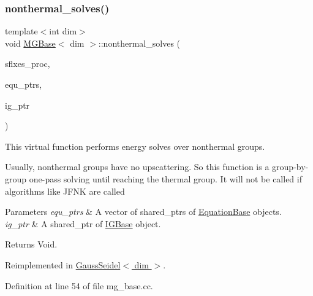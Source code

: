 \mbox{\label{class_m_g_base_a55ba9bef3616dd5eab9e3986f6e8e311}} 
\subsubsection{\texorpdfstring{nonthermal\+\_\+solves()}{nonthermal\_solves()}}
{\footnotesize\ttfamily template$<$int dim$>$ \\
void \hyperlink{class_m_g_base}{M\+G\+Base}$<$ dim $>$\+::nonthermal\+\_\+solves (\begin{DoxyParamCaption}\item[{std\+::vector$<$ Vector$<$ double $>$ $>$ \&}]{sflxes\+\_\+proc,  }\item[{std\+::vector$<$ std\+\_\+cxx11\+::shared\+\_\+ptr$<$ \hyperlink{class_equation_base}{Equation\+Base}$<$ dim $>$ $>$ $>$ \&}]{equ\+\_\+ptrs,  }\item[{std\+\_\+cxx11\+::shared\+\_\+ptr$<$ \hyperlink{class_i_g_base}{I\+G\+Base}$<$ dim $>$ $>$}]{ig\+\_\+ptr }\end{DoxyParamCaption})\hspace{0.3cm}{\ttfamily [virtual]}}

This virtual function performs energy solves over nonthermal groups.

Usually, nonthermal groups have no upscattering. So this function is a group-\/by-\/ group one-\/pass solving until reaching the thermal group. It will not be called if algorithms like J\+F\+NK are called


\begin{DoxyParams}{Parameters}
{\em equ\+\_\+ptrs} & A vector of shared\+\_\+ptr\textquotesingle{}s of \hyperlink{class_equation_base}{Equation\+Base} objects. \\
\hline
{\em ig\+\_\+ptr} & A shared\+\_\+ptr of \hyperlink{class_i_g_base}{I\+G\+Base} object. \\
\hline
\end{DoxyParams}
\begin{DoxyReturn}{Returns}
Void. 
\end{DoxyReturn}


Reimplemented in \hyperlink{class_gauss_seidel_a28fc4ef9150773f587f90951c704c994}{Gauss\+Seidel$<$ dim $>$}.



Definition at line 54 of file mg\+\_\+base.\+cc.

